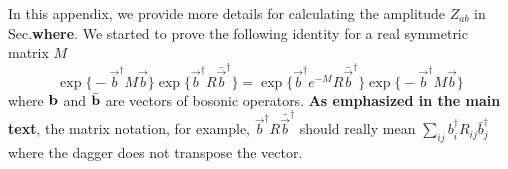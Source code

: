 
In this appendix, we provide more details for calculating the amplitude $Z_{ab}$ in Sec.{\bf\color{red}where}. We started to prove the following identity for a real symmetric matrix $M$
\begin{equation}
\label{1st id in app.pf_of_id}
\exp\Big\{- \vec{b}^{\dagger} M \vec{b}  \Big\} \exp \Big\{ \vec{b}^{\dagger} R \bar{\vec{b}}^{\dagger}  \Big\}  = \exp \Big\{ \vec{b}^{\dagger} e^{-M}  R \bar{\vec{b}}^{\dagger}  \Big\} \exp\Big\{- \vec{b}^{\dagger} M \vec{b}  \Big\} 
\end{equation}
where ${\bf b}$ and $\bar{\bf b}$ are vectors of bosonic operators. {\bf\color{red}As emphasized in the main text}, the matrix notation, for example, $\vec{b}^{\dagger} R \bar{\vec{b}}^{\dagger}$ should really mean $\sum_{ij}b^\dagger_iR_{ij}\bar{b}_j^\dagger$ where the dagger does not transpose the vector.  

